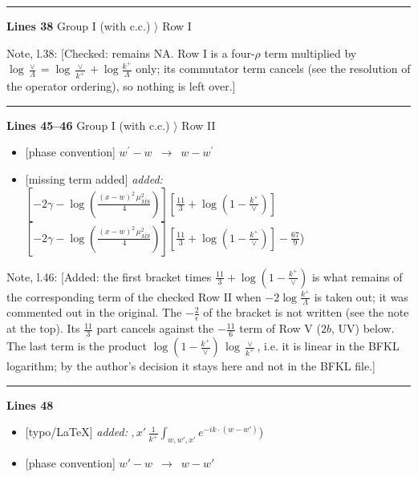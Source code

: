 \documentclass[10pt]{article}
\newenvironment{notebox}{\def\FrameCommand{{\color{notebar}\vrule width 1.5pt}\hspace{6pt}}\MakeFramed{\advance\hsize-\width\FrameRestore}\small}{\endMakeFramed}
\begin{document}
\noindent\rule{\linewidth}{0.3pt}\par\noindent\textbf{Lines 38} \quad \textsf{Group I (with c.c.) $\rangle$ Row I}\par
\begin{notebox}\textsf{\small Note, l.38:} [Checked: remains NA. Row I is a four-$\rho$ term multiplied by $\log\frac{\vee}{\Lambda}=\log\frac{\vee}{k^{+}}+\log\frac{k^{+}}{\Lambda}$ only; its commutator term cancels (see the resolution of the operator ordering), so nothing is left over.]\end{notebox}
\noindent\rule{\linewidth}{0.3pt}\par\noindent\textbf{Lines 45--46} \quad \textsf{Group I (with c.c.) $\rangle$ Row II} \par
\begin{itemize}[leftmargin=2.2em,itemsep=1pt,topsep=2pt]
\item[\textbf{l.45}] \textsf{\small [phase convention]} $\displaystyle w^\prime-w$\ $\longrightarrow$\ $\displaystyle w-w^\prime$
\item[\textbf{l.45}] \textsf{\small [missing term added]} \emph{added:} $\displaystyle [-2\gamma-\log{(\frac{(x-w)^{2}\,\mu^{2}_{\overline{MS}}}{4})}][\frac{11}{3}+\log{(1-\frac{k^{+}}{\vee})}]$$\displaystyle [-2\gamma-\log{(\frac{(x-w)^{2}\,\mu^{2}_{\overline{MS}}}{4})}][\frac{11}{3}+\log{(1-\frac{k^{+}}{\vee})}]-\frac{67}{9}${\color{gray}\small)}
\end{itemize}
\begin{notebox}\textsf{\small Note, l.46:} [Added: the first bracket times $\frac{11}{3}+\log(1-\frac{k^{+}}{\vee})$ is what remains of the corresponding term of the checked Row II when $-2\log\frac{k^{+}}{\Lambda}$ is taken out; it was commented out in the original. The $-\frac{2}{\epsilon}$ of the bracket is not written (see the note at the top). Its $\frac{11}{3}$ part cancels against the $-\frac{11}{6}$ term of Row V ($2b$, UV) below. The last term is the product $\log(1-\frac{k^{+}}{\vee})\,\log\frac{\vee}{k^{+}}$, i.e. it is linear in the BFKL logarithm; by the author's decision it stays here and not in the BFKL file.]\end{notebox}
\noindent\rule{\linewidth}{0.3pt}\par\noindent\textbf{Lines 48} \par
\begin{itemize}[leftmargin=2.2em,itemsep=1pt,topsep=2pt]
\item[\textbf{l.48}] \textsf{\small [typo/LaTeX]} \emph{added:} $\displaystyle ,x'$$\displaystyle \,\frac{1}{k^{+}}\int_{w,w',x'} e^{-ik\cdot(w-w')}${\color{gray}\small)}
\item[\textbf{l.48}] \textsf{\small [phase convention]} $\displaystyle w'-w$\ $\longrightarrow$\ $\displaystyle w-w'$
\end{itemize}
\end{document}
